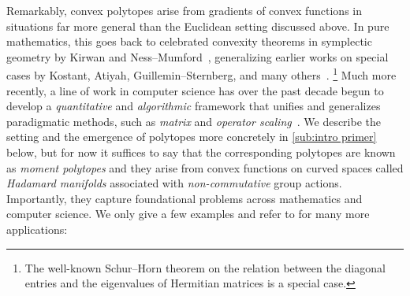 \documentclass[11pt,letterpaper]{article}
\numberwithin{equation}{section}
\begin{document}
Remarkably, convex polytopes arise from gradients of convex functions in situations far more general than the Euclidean setting discussed above.
In pure mathematics, this goes back to celebrated convexity theorems in symplectic geometry by Kirwan and Ness--Mumford~\cite{Kirwan1984,NessMumford1984}, generalizing earlier works on special cases by Kostant, Atiyah, Guillemin--Sternberg, and many others~\cite{kostant1973convexity,atiyah1982convexity,guillemin1982convexity}.%
\footnote{The well-known Schur--Horn theorem on the relation between the diagonal entries and the eigenvalues of Hermitian matrices is a special case.}
Much more recently, a line of work in computer science has over the past decade begun to develop a \emph{quantitative} and \emph{algorithmic} framework that unifies and generalizes paradigmatic methods, such as \emph{matrix} and \emph{operator scaling}~\cite{linial1998deterministic,GGOW-16,GGOW-18,AGLOW-18,BGOWW-alternating,BFGOWW2018,Franks2018,BFGOWW2019,FW2020,HNW2023,HiraiSakabe2024,Hirai2025,Hirai-ncrank}.
We describe the setting and the emergence of polytopes more concretely in \cref{sub:intro primer} below, but for now it suffices to say that the corresponding polytopes are known as \emph{moment polytopes} and they arise from convex functions on curved spaces called \emph{Hadamard manifolds} associated with \emph{non-commutative} group actions.
Importantly, they capture foundational problems across mathematics and computer science.
We only give a few examples and refer to \cite{BFGOWW2019} for many more applications:
\end{document}
